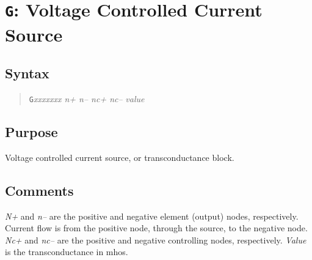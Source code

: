 \section{{\tt G}: Voltage Controlled Current Source}
\subsection{Syntax}
\begin{verse}
{\tt G}{\it xxxxxxx n+ n-- nc+ nc--} {\it value}
\end{verse}
\subsection{Purpose}

Voltage controlled current source, or transconductance block.
\subsection{Comments}

{\it N+} and {\it n--} are the positive and negative element (output) nodes,
respectively.  Current flow is from the positive node, through the source,
to the negative node.  {\it Nc+} and {\it nc--} are the positive and negative
controlling nodes, respectively.  {\it Value} is the transconductance in
mhos.
